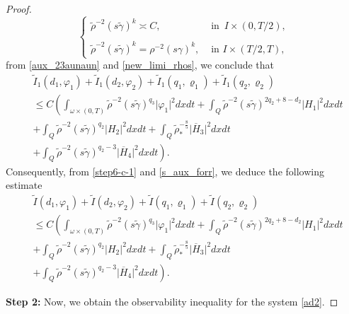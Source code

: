 \documentclass[11pt,a4paper]{amsart}
\numberwithin{equation}{section}
\begin{document}
\begin{proof}
\begin{equation}
\begin{cases} 
 		\displaystyle \tilde{\rho}^{-2}(s\tilde{\gamma})^{k} \asymp C, &\text{ in } \, I \times(0, T/2),\\
        \\
            \displaystyle \tilde{\rho}^{-2}(s\tilde{\gamma})^{k} = \displaystyle {\rho}^{-2}(s{\gamma})^{k}, &\text{ in } I \times(T/2, T),
 	      \end{cases}
    \end{equation}from \eqref{aux_23aunaun} and \eqref{new_limi_rhos}, we conclude that
\begin{equation}\label{s_aux_forr}
\begin{split}
&\tilde{I}_{1}(d_{1},\varphi_1)+\tilde{I}_{1}(d_{2},\varphi_{2})+\tilde{I}_{1}(q_{1},\varrho_1)+\tilde{I}_{1}(q_{2},\varrho_{2})\\
&\leq C\left(\int_{\omega\times (0,T)}\tilde{\rho}^{-2}(s\tilde{\gamma})^{q_3}\vert \varphi_1 \vert^2dxdt +\int_{Q}\tilde{\rho}^{-2}(s\tilde{\gamma})^{2q_{2}+8-d_{2}}\vert H_1\vert^2dxdt \right.\\
&+ \int_{Q}\tilde{\rho}^{-2}(s\tilde{\gamma})^{q_2}\vert H_2\vert^2dxdt+ \int_{Q}\tilde{\rho}^{-\frac{8}{5}}_{*}\vert \overline{H}_3\vert^2  dxdt\\
& \left.  +\int_{Q}\tilde{\rho}^{-2}(s\tilde{\gamma})^{q_2-3} \vert \overline{H}_4\vert^2  dxdt \right).
\end{split}
 \end{equation}Consequently, from \eqref{step6-c-1} and \eqref{s_aux_forr}, we deduce the following estimate
 \begin{equation}\label{step6-c-6}
\begin{split}
& \tilde{I}(d_{1},\varphi_1)+\tilde{I}(d_{2},\varphi_{2})+\tilde{I}(q_{1},\varrho_1)+\tilde{I}(q_{2},\varrho_{2})\\
&\leq C\left(\int_{\omega\times (0,T)}\tilde{\rho}^{-2}(s\tilde{\gamma})^{q_3}\vert \varphi_1 \vert^2dxdt +\int_{Q}\tilde{\rho}^{-2}(s\tilde{\gamma})^{2q_{2}+8-d_{2}}\vert H_1\vert^2dxdt \right.\\
&	  + \int_{Q}\tilde{\rho}^{-2}(s\tilde{\gamma})^{q_2}\vert H_2\vert^2dxdt+ \int_{Q}\tilde{\rho}^{-\frac{8}{5}}_{*} \vert \overline{H}_3\vert^2  dxdt\\
& \left.  +\int_{Q}\tilde{\rho}^{-2}(s\tilde{\gamma})^{q_2-3} \vert \overline{H}_4\vert^2  dxdt \right).
\end{split}
 \end{equation}

 \textbf{Step 2:} Now, we obtain  the  observability inequality  for the system \eqref{ad2}. 


\end{proof}
\end{document}
